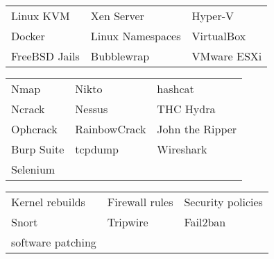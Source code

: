 \documentclass[a4paper,12pt]{memoir} %
\begin{document}

{\begin{tabular}{p{} p{} p{}}
	\bluebullet Linux KVM        & \bluebullet Xen Server        & \bluebullet Hyper-V                \\
	\bluebullet Docker           & \bluebullet Linux Namespaces  & \bluebullet VirtualBox             \\
	\bluebullet FreeBSD Jails    & \bluebullet Bubblewrap        & \bluebullet VMware ESXi
\end{tabular}}


{\begin{tabular}{p{} p{} p{}}
	\bluebullet Nmap             & \bluebullet Nikto             & \bluebullet hashcat                \\
	\bluebullet Ncrack           & \bluebullet Nessus            & \bluebullet THC Hydra              \\
	\bluebullet Ophcrack         & \bluebullet RainbowCrack      & \bluebullet John the Ripper        \\
	\bluebullet Burp Suite       & \bluebullet tcpdump           & \bluebullet Wireshark              \\
	\bluebullet Selenium
\end{tabular}}


{\begin{tabular}{p{} p{} p{}}
	\bluebullet Kernel rebuilds   & \bluebullet Firewall rules    & \bluebullet Security policies      \\
	\bluebullet Snort             & \bluebullet Tripwire          & \bluebullet Fail2ban               \\
	\bluebullet software patching
\end{tabular}}


\Sep %

\end{document}

